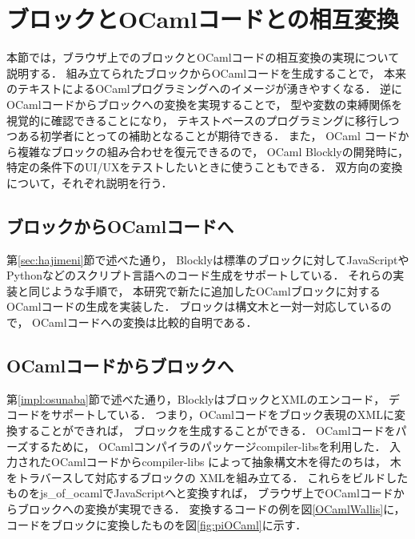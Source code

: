\chapter{ブロックとOCamlコードとの相互変換}\label{chap:converter}


本節では，ブラウザ上でのブロックとOCamlコードの相互変換の実現について説明する．
組み立てられたブロックからOCamlコードを生成することで，
本来のテキストによるOCamlプログラミングへのイメージが湧きやすくなる．
逆にOCamlコードからブロックへの変換を実現することで，
型や変数の束縛関係を視覚的に確認できることになり，
テキストベースのプログラミングに移行しつつある初学者にとっての補助となることが期待できる．
また， OCaml コードから複雑なブロックの組み合わせを復元できるので，
OCaml Blocklyの開発時に，
特定の条件下のUI/UXをテストしたいときに使うこともできる．
双方向の変換について，それぞれ説明を行う．

\section {ブロックからOCamlコードへ}
第\ref{sec:hajimeni}節で述べた通り，
Blocklyは標準のブロックに対してJavaScriptやPythonなどのスクリプト言語へのコード生成をサポートしている．
それらの実装と同じような手順で，
本研究で新たに追加したOCamlブロックに対するOCamlコードの生成を実装した．
ブロックは構文木と一対一対応しているので，
OCamlコードへの変換は比較的自明である．
\section {OCamlコードからブロックへ}
第\ref{impl:osunaba}節で述べた通り，BlocklyはブロックとXMLのエンコード，
デコードをサポートしている．
つまり，OCamlコードをブロック表現のXMLに変換することができれば，
ブロックを生成することができる．
OCamlコードをパーズするために，
OCamlコンパイラのパッケージcompiler-libsを利用した．
入力されたOCamlコードからcompiler-libs によって抽象構文木を得たのちは，
木をトラバースして対応するブロックの XMLを組み立てる．
これらをビルドしたものをjs\_of\_ocamlでJavaScriptへと変換すれば，
ブラウザ上でOCamlコードからブロックへの変換が実現できる．
変換するコードの例を図\ref{OCamlWallis}に，
コードをブロックに変換したものを図\ref{fig:piOCaml}に示す．

